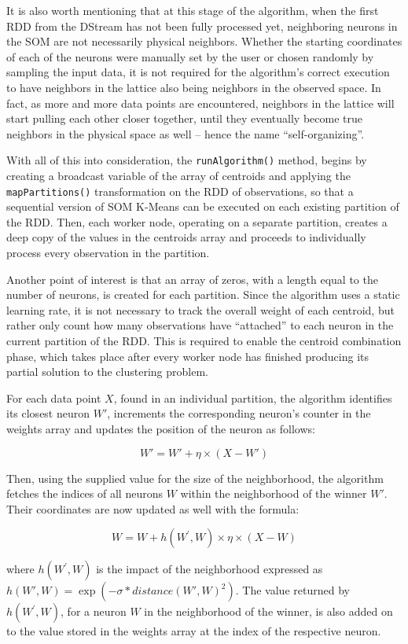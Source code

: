 \documentclass{l4proj}
\begin{document}
It is also worth mentioning that at this stage of the algorithm, when the first RDD from the DStream has not been fully processed yet, neighboring neurons in the SOM are not necessarily physical neighbors. Whether the starting coordinates of each of the neurons were manually set by the user or chosen randomly by sampling the input data, it is not required for the algorithm's correct execution to have neighbors in the lattice also being neighbors in the observed space. In fact, as more and more data points are encountered, neighbors in the lattice will start pulling each other closer together, until they eventually become true neighbors in the physical space as well -- hence the name ``self-organizing''.

With all of this into consideration, the \texttt{runAlgorithm()} method, begins by creating a broadcast variable of the array of centroids and applying the \texttt{mapPartitions()} transformation on the RDD of observations, so that a sequential version of SOM K-Means can be executed on each existing partition of the RDD. Then, each worker node, operating on a separate partition, creates a deep copy of the values in the centroids array and proceeds to individually process every observation in the partition. 

Another point of interest is that an array of zeros, with a length equal to the number of neurons, is created for each partition. Since the algorithm uses a static learning rate, it is not necessary to track the overall weight of each centroid, but rather only count how many observations have ``attached'' to each neuron in the current partition of the RDD. This is required to enable the centroid combination phase, which takes place after every worker node has finished producing its partial solution to the clustering problem.

For each data point $X$, found in an individual partition, the algorithm identifies its closest neuron $W'$, increments the corresponding neuron's counter in the weights array and updates the position of the neuron as follows:

$$W' = W' + \eta\times(X-W')$$

\noindent Then, using the supplied value for the size of the neighborhood, the algorithm fetches the indices of all neurons $W$ within the neighborhood of the winner $W'$. Their coordinates are now updated as well with the formula:

$$W = W + h(W^{\prime},W)\times\eta\times(X-W)$$

\noindent where $h(W^{\prime},W)$ is the impact of the neighborhood expressed as $h(W',W) = \exp(-\sigma*distance(W', W)^2)$. The value returned by $h(W^{\prime},W)$, for a neuron $W$ in the neighborhood of the winner, is also added on to the value stored in the weights array at the index of the respective neuron.
\end{document}
